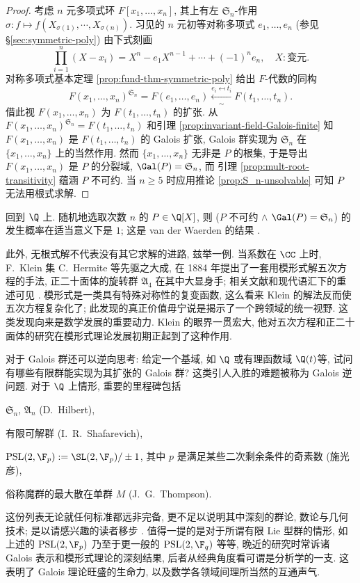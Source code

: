 \begin{proof}
	考虑 $n$ 元多项式环 $F[x_1, \ldots, x_n]$, 其上有左 $\mathfrak{S}_n$-作用 $\sigma: f \mapsto f(X_{\sigma(1)}, \cdots, X_{\sigma(n)})$. 习见的 $n$ 元初等对称多项式 $e_1, \ldots, e_n$ (参见 \S\ref{sec:symmetric-poly}) 由下式刻画
	\[ \prod_{i=1}^n (X - x_i) = X^n - e_1 X^{n-1} + \cdots + (-1)^n e_n, \quad X: \text{变元}. \]
	对称多项式基本定理 \ref{prop:fund-thm-symmetric-poly} 给出 $F$-代数的同构
	\[ F(x_1, \ldots, x_n)^{\mathfrak{S}_n} = F(e_1, \ldots, e_n) \xleftarrow[\sim]{e_i \mapsfrom t_i} F(t_1, \ldots, t_n). \]
	借此视 $F(x_1, \ldots, x_n)$ 为 $F(t_1, \ldots, t_n)$ 的扩张. 从 $F(x_1, \ldots, x_n)^{\mathfrak{S}_n} = F(t_1, \ldots, t_n)$ 和引理 \ref{prop:invariant-field-Galois-finite} 知 $F(x_1, \ldots, x_n)$ 是 $F(t_1, \ldots, t_n)$ 的 Galois 扩张, Galois 群实现为 $\mathfrak{S}_n$ 在 $\{x_1, \ldots, x_n\}$ 上的当然作用. 然而 $\{x_1, \ldots, x_n\}$ 无非是 $P$ 的根集, 于是导出 $F(x_1, \ldots, x_n)$ 是 $P$ 的分裂域, $\Gal(P) = \mathfrak{S}_n$, 而 引理 \ref{prop:mult-root-transitivity} 蕴涵 $P$ 不可约. 当 $n \geq 5$ 时应用推论 \ref{prop:S_n-unsolvable} 可知 $P$ 无法用根式求解.
\end{proof}

回到 $\Q$ 上. 随机地选取次数 $n$ 的 $P \in \Q[X]$, 则 ($P$ 不可约 \;$\wedge$\; $\Gal(P) = \mathfrak{S}_n$) 的发生概率在适当意义下是 $1$; 这是 van der Waerden 的结果 \cite{vdW34}.

此外, 无根式解不代表没有其它求解的进路, 兹举一例. 当系数在 $\CC$ 上时, F.\ Klein 集 C.\ Hermite 等先驱之大成, 在 1884 年提出了一套用模形式解五次方程的手法, 正二十面体的旋转群 $\mathfrak{A}_4$ 在其中大显身手; 相关文献和现代语汇下的重述可见 \cite{Na14}. 模形式是一类具有特殊对称性的复变函数, 这么看来 Klein 的解法反而使五次方程复杂化了; 此发现的真正价值毋宁说是揭示了一个跨领域的统一视野. 这类发现向来是数学发展的重要动力. Klein 的眼界一贯宏大, 他对五次方程和正二十面体的研究在模形式理论发展初期正起到了这种作用.

对于 Galois 群还可以逆向思考: 给定一个基域, 如 $\Q$ 或有理函数域 $\Q(t)$等, 试问有哪些有限群能实现为其扩张的 Galois 群? 这类引人入胜的难题被称为 Galois 逆问题. 对于 $\Q$ 上情形, 重要的里程碑包括 
\begin{compactitem}
	\item $\mathfrak{S}_n$, $\mathfrak{A}_n$ (D.\ Hilbert),
	\item 有限可解群 (I.\ R.\ Shafarevich),
	\item $\text{PSL}(2, \F_p) := \SL(2, \F_p)/\pm 1$, 其中 $p$ 是满足某些二次剩余条件的奇素数 (施光彦),
	\item 俗称魔群的最大散在单群 $M$ (J.\ G.\ Thompson).
\end{compactitem}
这份列表无论就任何标准都远非完备, 更不足以说明其中深刻的群论, 数论与几何技术; 是以请感兴趣的读者移步 \cite{Ser08}. 值得一提的是对于所谓有限 Lie 型群的情形, 如上述的 $\text{PSL}(2, \F_p)$ 乃至于更一般的 $\text{PSL}(2, \F_q)$ 等等, 晚近的研究时常诉诸 Galois 表示和模形式理论的深刻结果, 后者从经典角度看可谓是分析学的一支. 这表明了 Galois 理论旺盛的生命力, 以及数学各领域间理所当然的互通声气.


